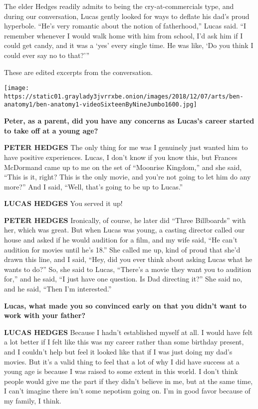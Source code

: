 The elder Hedges readily admits to being the cry-at-commercials type,
and during our conversation, Lucas gently looked for ways to deflate his
dad's proud hyperbole. ``He's very romantic about the notion of
fatherhood,'' Lucas said. ``I remember whenever I would walk home with
him from school, I'd ask him if I could get candy, and it was a `yes'
every single time. He was like, `Do you think I could ever say no to
that?'''

These are edited excerpts from the conversation.

\texttt{[image: https://static01.graylady3jvrrxbe.onion/images/2018/12/07/arts/ben-anatomy1/ben-anatomy1-videoSixteenByNineJumbo1600.jpg]}

\textbf{Peter, as a parent, did you have any concerns as Lucas's career
started to take off at a young age?}

\textbf{PETER HEDGES} The only thing for me was I genuinely just wanted
him to have positive experiences. Lucas, I don't know if you know this,
but Frances McDormand came up to me on the set of ``Moonrise Kingdom,''
and she said, ``This is it, right? This is the only movie, and you're
not going to let him do any more?'' And I said, ``Well, that's going to
be up to Lucas.''

\textbf{LUCAS HEDGES} You served it up!

\textbf{PETER HEDGES} Ironically, of course, he later did ``Three
Billboards'' with her, which was great. But when Lucas was young, a
casting director called our house and asked if he would audition for a
film, and my wife said, ``He can't audition for movies until he's 18.''
She called me up, kind of proud that she'd drawn this line, and I said,
``Hey, did you ever think about asking Lucas what he wants to do?'' So,
she said to Lucas, ``There's a movie they want you to audition for,''
and he said, ``I just have one question. Is Dad directing it?'' She said
no, and he said, ``Then I'm interested.''

\textbf{Lucas, what made you so convinced early on that you didn't want
to work with your father?}

\textbf{LUCAS HEDGES} Because I hadn't established myself at all. I
would have felt a lot better if I felt like this was my career rather
than some birthday present, and I couldn't help but feel it looked like
that if I was just doing my dad's movies. But it's a valid thing to feel
that a lot of why I did have success at a young age is because I was
raised to some extent in this world. I don't think people would give me
the part if they didn't believe in me, but at the same time, I can't
imagine there isn't some nepotism going on. I'm in good favor because of
my family, I think.

